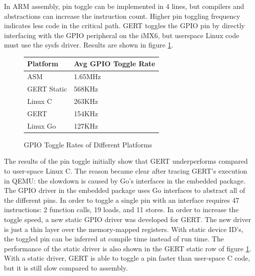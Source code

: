 In ARM assembly, pin toggle can be implemented in 4 lines, but compilers and 
abstractions can increase the instruction count. Higher pin
toggling frequency indicates less code in the critical path.
GERT toggles the GPIO pin by directly interfacing with the GPIO
peripheral on the iMX6, but userspace Linux code must use the
sysfs driver.
Results are shown in figure \ref{fig:toggle}.


\begin{figure} [h]
\begin{center}
  \begin{tabular}{ | l | l |}
    \hline
    Platform & Avg GPIO Toggle Rate \\ \hline
    ASM & 1.65MHz \\ \hline
    GERT Static & 568KHz \\ \hline
    Linux C & 263KHz \\ \hline
    GERT & 154KHz \\ \hline
    Linux Go & 127KHz \\
    \hline
  \end{tabular}
\end{center}
  \caption{GPIO Toggle Rates of Different Platforms}  \label{fig:toggle}
\end{figure}


The results of the pin toggle initially show that GERT underperforms compared to
user-space Linux C. The reason became clear after tracing GERT's execution in QEMU:
the slowdown is caused by Go's interfaces in the embedded package. The GPIO driver
in the embedded package uses Go interfaces to abstract all of the different pins.
In order to toggle a single pin with an interface requires 47 instructions:
2 function calls, 19 loads, and 11 stores. In order to increase the toggle speed,
a new static GPIO driver was developed for GERT. The new driver is just a thin layer
over the memory-mapped registers. With static device ID's, the toggled pin
can be inferred at compile time instead of run time.
The performance of the static driver is also shown in the GERT static row
of figure \ref{fig:toggle}. With a static driver, GERT is able to toggle a
pin faster than user-space C code, but it is still slow compared to
assembly.

